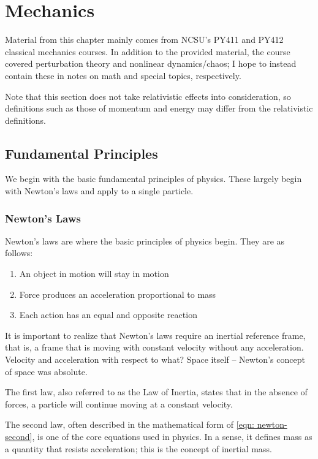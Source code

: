\documentclass[main.tex]{subfiles}
\begin{document}
\part{Mechanics}


Material from this chapter mainly comes from NCSU's PY411 and PY412 classical
mechanics courses. In addition to the provided material, the course covered perturbation
theory and nonlinear dynamics/chaos; I hope to instead contain these in notes on math
and special topics, respectively.

Note that this section does not take relativistic effects into consideration, so definitions
such as those of momentum and energy may differ from the relativistic definitions.

\chapter{Fundamental Principles}

We begin with the basic fundamental principles of physics. These largely begin with
Newton's laws and apply to a single particle.

\section{Newton's Laws}


Newton's laws are where the basic principles of physics begin. They are as follows:

\begin{enumerate}
\item An object in motion will stay in motion
\item Force produces an acceleration proportional to mass
\item Each action has an equal and opposite reaction
\end{enumerate}

It is important to realize that Newton's laws require an inertial reference frame, that is,
a frame that is moving with constant velocity without any acceleration. Velocity and
acceleration with respect to what? Space itself -- Newton's concept of space was absolute.

The first law, also referred to as the Law of Inertia, states that in the absence of forces,
a particle will continue moving at a constant velocity.

The second law, often described in the mathematical form of \cref{eqn: newton-second},
is one of the core equations used in physics. In a sense, it defines mass as a quantity
that resists acceleration; this is the concept of inertial mass.
\end{document}
